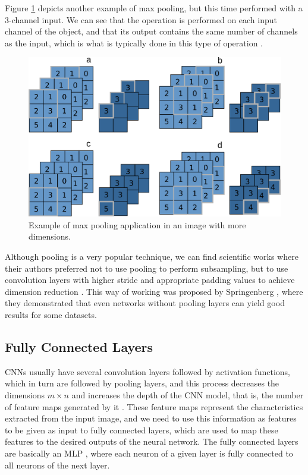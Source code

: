 Figure \ref{fig:figure122} depicts another example of max pooling, but this time performed with a 3-channel input. We can see that the operation is performed on each input channel of the object, and that its output contains the same number of channels as the input, which is what is typically done in this type of operation \cite{geron2019}.

\begin{figure}[h]
    \centering
    \includegraphics[scale=0.30]{"Part 3 - Learning Systems/Supervised Learning/Deep Learning/images/figure122.png"}
    \caption{Example of max pooling application in an image with more dimensions.}
    \label{fig:figure122}
\end{figure}

Although pooling is a very popular technique, we can find scientific works where their authors preferred not to use pooling to perform subsampling, but to use convolution layers with higher stride and appropriate padding values to achieve dimension reduction \cite{elgendy2020,adrian2017}. This way of working was proposed by Springenberg \cite{springenberg2014striving}, where they demonstrated that even networks without pooling layers can yield good results for some datasets. %

\subsection{Fully Connected Layers}

CNNs usually have several convolution layers followed by activation functions, which in turn are followed by pooling layers, and this process decreases the dimensions $m \times n$ and increases the depth of the CNN model, that is, the number of feature maps generated by it \cite{elgendy2020,geron2019}. These feature maps represent the characteristics extracted from the input image, and we need to use this information as features to be given as input to fully connected layers, which are used to map these features to the desired outputs of the neural network. The fully connected layers are basically an MLP \cite{elgendy2020}, where each neuron of a given layer is fully connected to all neurons of the next layer.

